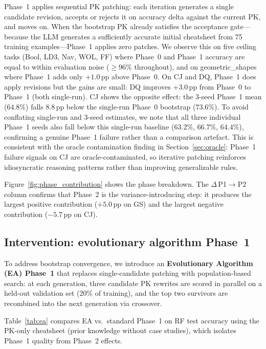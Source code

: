 \documentclass{article}
\begin{document}
Phase~1 applies sequential PK patching: each iteration generates a single candidate revision,
accepts or rejects it on accuracy delta against the current PK, and moves on.
When the bootstrap PK already satisfies the acceptance gate---because the LLM generates a
sufficiently accurate initial cheatsheet from 75 training examples---Phase~1 applies zero
patches.
We observe this on five ceiling tasks (Bool, LD3, Nav, WOL, FF) where Phase~0 and Phase~1
accuracy are equal to within evaluation noise ($\geq$96\% throughout), and on geometric\_shapes
where Phase~1 adds only $+1.0$\,pp above Phase~0.
On CJ and DQ, Phase~1 does apply revisions but the gains are small: DQ improves
$+3.0$\,pp from Phase~0 to Phase~1 (both single-run).
CJ shows the opposite effect: the 3-seed Phase~1 mean ($64.8\%$) falls $8.8$\,pp below
the single-run Phase~0 bootstrap ($73.6\%$).
To avoid conflating single-run and 3-seed estimates, we note that all three individual
Phase~1 seeds also fall below this single-run baseline ($63.2\%$, $66.7\%$, $64.4\%$),
confirming a genuine Phase~1 failure rather than a comparison artefact.
This is consistent with the oracle contamination finding in Section~\ref{sec:oracle}:
Phase~1 failure signals on CJ are oracle-contaminated, so iterative patching reinforces
idiosyncratic reasoning patterns rather than improving generalizable rules.

Figure~\ref{fig:phase_contribution} shows the phase breakdown.
The $\Delta$\,P1$\!\to$\!P2 column confirms that Phase~2 is the variance-introducing step:
it produces the largest positive contribution ($+5.0$\,pp on GS) and the largest negative
contribution ($-5.7$\,pp on CJ).

\subsection{Intervention: evolutionary algorithm Phase~1}
\label{sec:ea}

To address bootstrap convergence, we introduce an \textbf{Evolutionary Algorithm (EA) Phase~1}
that replaces single-candidate patching with population-based search: at each generation,
three candidate PK rewrites are scored in parallel on a held-out validation set (20\% of
training), and the top two survivors are recombined into the next generation via crossover.

Table~\ref{tab:ea} compares EA vs.\ standard Phase~1 on RF test accuracy using the PK-only
cheatsheet (prior knowledge without case studies), which isolates Phase~1 quality from
Phase~2 effects.
\end{document}
